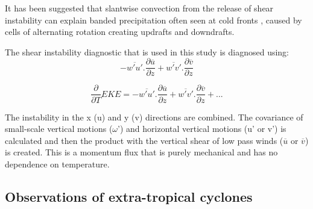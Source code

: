 It has been suggested that slantwise convection from the release of shear instability can explain banded precipitation often seen at cold fronts \citep{bennetts1979conditional, seltzer1985possible}, caused by cells of alternating rotation creating updrafts and downdrafts.

The shear instability diagnostic that is used in this study is diagnosed using:
\begin{equation} \label{eq_diag}
-\overline{w'u'} . \frac{\partial{\overline u}}{\partial z} + \overline{w'v'} . \frac{\partial{\overline v}}{\partial z}
\end{equation}

\begin{equation} \label{eq_diag}
\frac{\partial}{\partial{T}} EKE = -\overline{w'u'} . \frac{\partial{\overline u}}{\partial z} + \overline{w'v'} . \frac{\partial{\overline v}}{\partial z} + ...
\end{equation}

The instability in the x (u) and y (v) directions are combined. The covariance of small-scale vertical motions ($\omega$') and horizontal vertical motions (u' or v') is calculated and then the  product with the vertical shear of low pass winds ($\overline{u}$ or $\overline{v}$)  is created. This is a momentum flux that is purely mechanical and has no dependence on temperature.

%

%
%


%
%
%

\subsection {Observations of extra-tropical cyclones}

